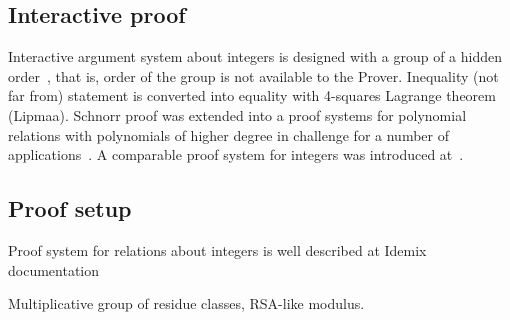 \documentclass{llncs}
\begin{document}
\subsection{Interactive proof}

Interactive argument system about integers is designed
with a group of a hidden order~\cite{},
that is, order of the group is not available to the Prover.
Inequality (not far from) statement is converted into equality
with 4-squares Lagrange theorem (Lipmaa).
Schnorr proof was extended into a proof systems for polynomial relations
with polynomials of higher degree in challenge
for a number of applications~\cite{F363,CF12}.
A comparable proof system for integers was introduced at~\cite{F10}.

\subsection{Proof setup}

Proof system for relations about integers is well described at Idemix documentation~\cite{Indemix}

Multiplicative group of residue classes, RSA-like modulus.
\end{document}
